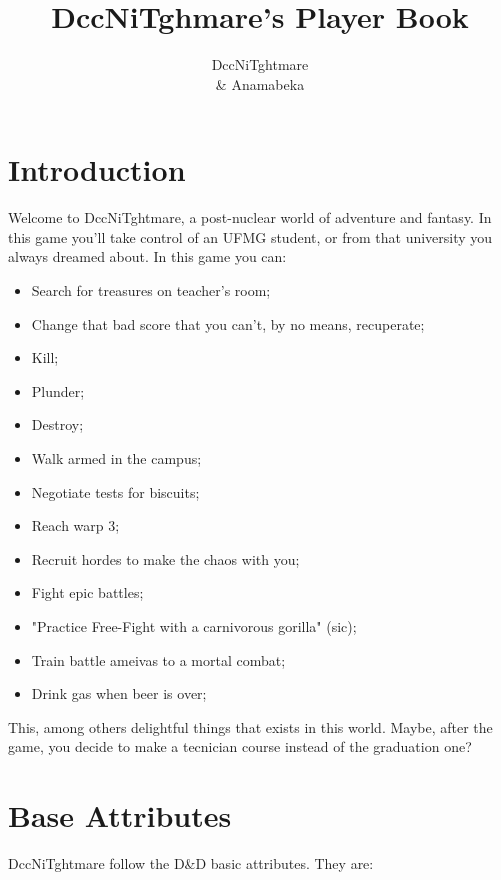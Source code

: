 \documentclass[ letterpaper,12pt]{article}
\begin{document}
\title{\textbf{DccNiTghmare's Player Book}}

\author{
DccNiTghtmare\\ \& Anamabeka
}

\maketitle
{}

\newpage

\tableofcontents

\newpage
\section{Introduction}

Welcome to DccNiTghtmare, a post-nuclear world of adventure and fantasy. In
this game you'll take control of an UFMG student, or from that university you
always dreamed about. In this game you can:

\begin{itemize}
\item{Search for treasures on teacher's room;}
\item{Change that bad score that you can't, by no means, recuperate;}
\item{Kill;}
\item{Plunder;}
\item{Destroy;}
\item{Walk armed in the campus;}
\item{Negotiate tests for biscuits;}
\item{Reach warp 3;}
\item{Recruit hordes to make the chaos with you;}
\item{Fight epic battles;}
\item{"Practice Free-Fight with a carnivorous gorilla" (sic);}
\item{Train battle ameivas to a mortal combat;}
\item{Drink gas when beer is over;}
\end{itemize}

This, among others delightful things that exists in this world. Maybe, after the game, you decide to make a tecnician course instead of the graduation one?

\section{Base Attributes}
DccNiTghtmare follow the D\&D basic attributes. They are:
\end{document}

